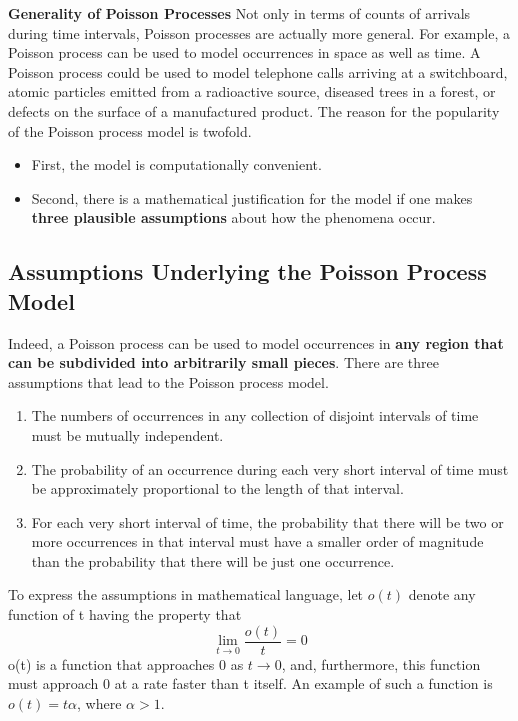 \documentclass[letterpaper,12pt]{article}
\theoremstyle{plain}
\begin{document}
\textbf{Generality of Poisson Processes} Not only in terms of counts of arrivals during time intervals, Poisson processes are actually more general. For example, a Poisson process can be used to model occurrences in space as well as time. A Poisson process could be used to model telephone calls arriving at a switchboard, atomic particles emitted from a radioactive source, diseased trees in a forest, or defects on the surface of a manufactured product. The reason for the popularity of the Poisson process model is twofold. \begin{itemize}
\item First, the model is computationally convenient. \item Second, there is a mathematical justification for the model if one makes \textbf{three plausible assumptions} about how the phenomena occur.
\end{itemize}

\subsection{Assumptions Underlying the Poisson Process Model}
Indeed, a Poisson process can be used to model occurrences in \textbf{any region that can be subdivided into arbitrarily small pieces}. There are three assumptions that lead to the Poisson process model.
\begin{enumerate}
\item \label{assumption 1}The numbers of occurrences in any collection of disjoint intervals of time must be mutually independent. 

\item \label{assumption 2} The probability of an occurrence during each very short interval of time must be approximately proportional to the length of that interval. 

\item \label{assumption 3} For each very short interval of time, the probability that there will be two or more occurrences in that interval must have a smaller order of magnitude than the probability that there will be just one occurrence. \end{enumerate}

To express the assumptions in mathematical language, let $o(t)$ denote any function of t having the property that \begin{equation}\label{eq:2}
\lim_{t\to 0}\frac{o(t)}{t}=0
\end{equation} o(t) is a function that approaches 0 as $t\to 0$, and, furthermore, this function must approach 0 at a rate faster than t itself. An example of such a function is $o(t) =t\alpha$, where $\alpha > 1$.
\end{document}
